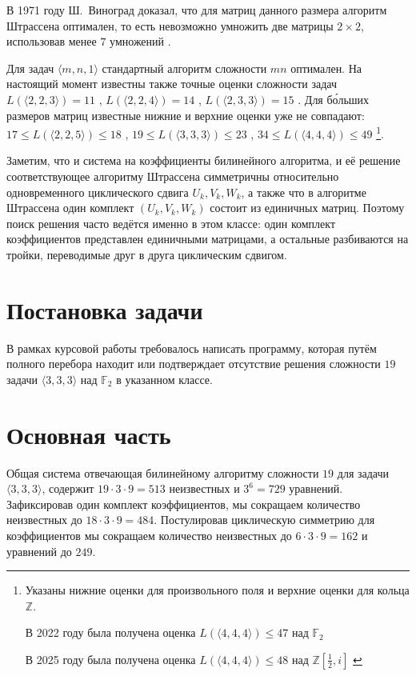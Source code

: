 \documentclass[12pt]{article}
\begin{document}
В 1971 году Ш.~Виноград доказал, что для матриц данного размера алгоритм Штрассена оптимален, то есть невозможно умножить две матрицы $2 \times 2$, использовав менее $7$ умножений \cite{W}.

Для задач $\langle m, n, 1 \rangle$ стандартный алгоритм сложности $mn$ оптимален.
На настоящий момент известны также точные оценки сложности задач $L(\langle 2, 2, 3 \rangle) = 11$ \cite{A}, $L(\langle 2, 2, 4 \rangle) = 14$ \cite{AS}, $L(\langle 2, 3, 3 \rangle) = 15$ \cite{?}.
Для б\'{о}льших размеров матриц известные нижние и верхние оценки уже не совпадают:
$17 \leqslant L(\langle 2, 2, 5 \rangle) \leqslant 18$ \cite{?},
$19 \leqslant L(\langle 3, 3, 3 \rangle) \leqslant 23$ \cite{L, ?},
$34 \leqslant L(\langle 4, 4, 4 \rangle) \leqslant 49$ \cite{?}
\footnote{Указаны нижние оценки для произвольного поля и верхние оценки для кольца $\mathbb Z$.

В 2022 году была получена оценка $L(\langle 4, 4, 4 \rangle) \leqslant 47$ над $\mathbb F_2$ \cite{F}

В 2025 году была получена оценка $L(\langle 4, 4, 4 \rangle) \leqslant 48$ над $\mathbb Z[\frac{1}{2}, i]$ \cite{N}
}.

Заметим, что и система на коэффициенты билинейного алгоритма, и её решение соответствующее алгоритму Штрассена симметричны относительно одновременного циклического сдвига $U_k, V_k, W_k$, а также что в алгоритме Штрассена один комплект $(U_k, V_k, W_k)$ состоит из единичных матриц. Поэтому поиск решения часто ведётся именно в этом классе: один комплект коэффициентов представлен единичными матрицами, а остальные разбиваются на тройки, переводимые друг в друга циклическим сдвигом.

\section{Постановка задачи}

В рамках курсовой работы требовалось написать программу, которая путём полного перебора находит или подтверждает отсутствие решения сложности $19$ задачи $\langle 3, 3, 3 \rangle$ над $\mathbb F_2$ в указанном классе.

\section{Основная часть}

Общая система отвечающая билинейному алгоритму сложности $19$ для задачи $\langle 3, 3, 3 \rangle$,
содержит $19 \cdot 3 \cdot 9 = 513$ неизвестных и $3^6 = 729$ уравнений. Зафиксировав один комплект коэффициентов, мы сокращаем количество неизвестных до $18 \cdot 3 \cdot 9 = 484$. Постулировав циклическую симметрию для коэффициентов мы сокращаем количество неизвестных до $6 \cdot 3 \cdot 9 = 162$ и уравнений до $249$.
\end{document}
